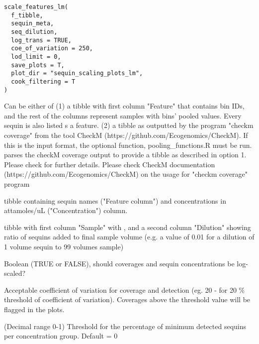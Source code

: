 \documentclass[a4paper]{book}
\begin{document}
%
\begin{Usage}
\begin{verbatim}
scale_features_lm(
  f_tibble,
  sequin_meta,
  seq_dilution,
  log_trans = TRUE,
  coe_of_variation = 250,
  lod_limit = 0,
  save_plots = T,
  plot_dir = "sequin_scaling_plots_lm",
  cook_filtering = T
)
\end{verbatim}
\end{Usage}
%
\begin{Arguments}
\begin{ldescription}
\item[\code{f\_tibble}] Can be either of
(1) a tibble with first column "Feature" that contains bin IDs, and the rest of the columns represent samples with bins' pooled values. Every sequin is also listed s a feature.
(2) a tibble as outputted by the program "checkm coverage" from the tool CheckM (https://github.com/Ecogenomics/CheckM). If this is the input format, the optional function, pooling\_functions.R must be run.  parses the checkM coverage output to provide a tibble as described in option 1. Please check  for further details. Please check CheckM documentation (https://github.com/Ecogenomics/CheckM) on the usage for "checkm coverage" program

\item[\code{sequin\_meta}] tibble containing sequin names ("Feature column") and concentrations in attamoles/uL ("Concentration") column.

\item[\code{seq\_dilution}] tibble with first column "Sample" with , and a second column "Dilution" showing ratio of sequins added to final sample volume (e.g. a value of 0.01 for a dilution of 1 volume sequin to 99 volumes sample)

\item[\code{log\_trans}] Boolean (TRUE or FALSE), should coverages and sequin concentrations be log-scaled?

\item[\code{coe\_of\_variation}] Acceptable coefficient of variation for coverage and detection (eg. 20 - for 20 \% threshold of coefficient of variation). Coverages above the threshold value will be flagged in the plots.

\item[\code{lod\_limit}] (Decimal range 0-1) Threshold for the percentage of minimum detected sequins per concentration group. Default = 0


\end{ldescription}
\end{Arguments}
\end{document}
